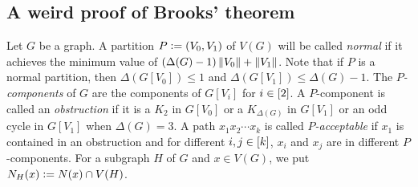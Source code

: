 \subsection{A weird proof of Brooks' theorem}
Let $G$ be a graph.  A partition $P \mathrel{\mathop:}= (V_0, V_1)$ of $V(G)$
will be called \emph{normal} if it achieves the minimum value of $(\Delta(G) -
1)\left\Vert V_0\right\Vert + \left\Vert V_1\right\Vert$.  Note that if $P$ is a normal partition, then
$\Delta(G[V_0]) \leq 1$ and $\Delta(G[V_1]) \leq \Delta(G) - 1$.  
The \emph{$P$-components} of $G$ are the components of $G[V_i]$ for $i \in
\left[2\right]$.  A $P$-component is called an \emph{obstruction} if it is a
$K_2$ in $G[V_0]$ or a $K_{\Delta(G)}$ in $G[V_1]$ or an odd cycle in $G[V_1]$ when
$\Delta(G) = 3$.  A path $x_1x_2\cdots x_k$ is called \emph{$P$-acceptable} if
$x_1$ is contained in an obstruction and for different $i, j \in \left[k\right]$, $x_i$ and
$x_j$ are in different $P$-components.  For a subgraph $H$ of $G$ and $x \in V(G)$, 
we put $N_H(x) \mathrel{\mathop:}= N(x) \cap V(H)$.

